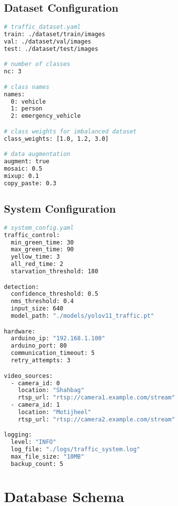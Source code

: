 \subsection{Dataset Configuration}
\begin{lstlisting}[language=bash, caption=Dataset Configuration YAML]
# traffic_dataset.yaml
train: ./dataset/train/images
val: ./dataset/val/images
test: ./dataset/test/images

# number of classes
nc: 3

# class names
names:
  0: vehicle
  1: person
  2: emergency_vehicle

# class weights for imbalanced dataset
class_weights: [1.0, 1.2, 3.0]

# data augmentation
augment: true
mosaic: 0.5
mixup: 0.1
copy_paste: 0.3
\end{lstlisting}

\subsection{System Configuration}
\begin{lstlisting}[language=bash, caption=System Configuration]
# system_config.yaml
traffic_control:
  min_green_time: 30
  max_green_time: 90
  yellow_time: 3
  all_red_time: 2
  starvation_threshold: 180

detection:
  confidence_threshold: 0.5
  nms_threshold: 0.4
  input_size: 640
  model_path: "./models/yolov11_traffic.pt"

hardware:
  arduino_ip: "192.168.1.100"
  arduino_port: 80
  communication_timeout: 5
  retry_attempts: 3

video_sources:
  - camera_id: 0
    location: "Shahbag"
    rtsp_url: "rtsp://camera1.example.com/stream"
  - camera_id: 1
    location: "Motijheel"
    rtsp_url: "rtsp://camera2.example.com/stream"

logging:
  level: "INFO"
  log_file: "./logs/traffic_system.log"
  max_file_size: "10MB"
  backup_count: 5
\end{lstlisting}

\section{Database Schema}
\label{app:database_schema}

